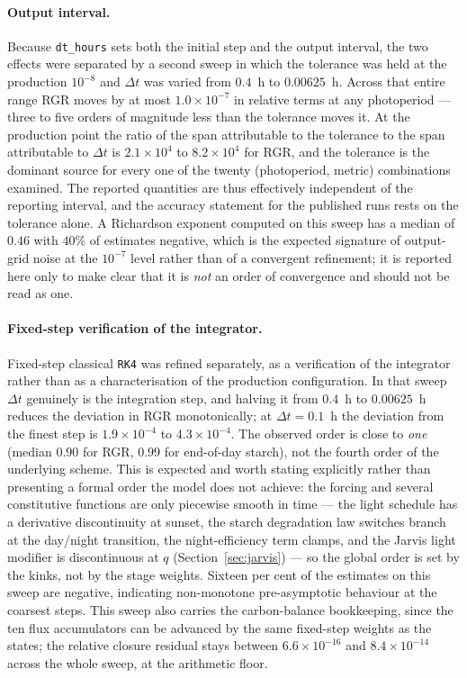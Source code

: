 \documentclass[a4paper,fleqn]{cas-sc}
\begin{document}
\paragraph{Output interval.}
Because \texttt{dt\_hours} sets both the initial step and the output interval,
the two effects were separated by a second sweep in which the tolerance was
held at the production $10^{-8}$ and $\Delta t$ was varied from $0.4$~h to
$0.00625$~h. Across that entire range RGR moves by at most $1.0\times10^{-7}$
in relative terms at any photoperiod --- three to five orders of magnitude
less than the tolerance moves it. At the production point the ratio of the span
attributable to the tolerance to the span attributable to $\Delta t$ is
$2.1\times10^{4}$ to $8.2\times10^{4}$ for RGR, and the tolerance is the
dominant source for every one of the twenty (photoperiod, metric) combinations
examined. The reported quantities are thus effectively independent of the
reporting interval, and the accuracy statement for the published runs rests on
the tolerance alone. A Richardson exponent computed on this sweep has a median
of $0.46$ with $40\%$ of estimates negative, which is the expected signature of
output-grid noise at the $10^{-7}$ level rather than of a convergent
refinement; it is reported here only to make clear that it is \emph{not} an
order of convergence and should not be read as one.

\paragraph{Fixed-step verification of the integrator.}
Fixed-step classical \texttt{RK4} was refined separately, as a verification of
the integrator rather than as a characterisation of the production
configuration. In that sweep $\Delta t$ genuinely is the integration step, and
halving it from $0.4$~h to $0.00625$~h reduces the deviation in RGR
monotonically; at $\Delta t = 0.1$~h the deviation from the finest step is
$1.9\times10^{-4}$ to $4.3\times10^{-4}$. The observed order is close to
\emph{one} (median $0.90$ for RGR, $0.99$ for end-of-day starch), not the
fourth order of the underlying scheme. This is expected and worth stating
explicitly rather than presenting a formal order the model does not achieve:
the forcing and several constitutive functions are only piecewise smooth in
time --- the light schedule has a derivative discontinuity at sunset, the
starch degradation law switches branch at the day/night transition, the
night-efficiency term clamps, and the Jarvis light modifier is discontinuous at
$q$ (Section~\ref{sec:jarvis}) --- so the global order is set by the kinks, not
by the stage weights. Sixteen per cent of the estimates on this sweep are
negative, indicating non-monotone pre-asymptotic behaviour at the coarsest
steps. This sweep also carries the carbon-balance bookkeeping, since the ten
flux accumulators can be advanced by the same fixed-step weights as the states;
the relative closure residual stays between $6.6\times10^{-16}$ and
$8.4\times10^{-14}$ across the whole sweep, at the arithmetic floor.
\end{document}
